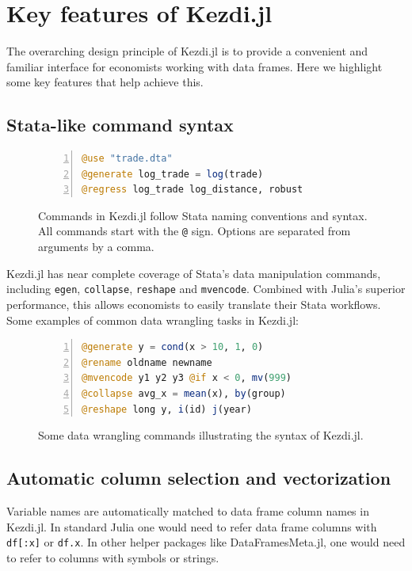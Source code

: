 \documentclass{juliacon}
\begin{document}
\section{Key features of Kezdi.jl}

The overarching design principle of Kezdi.jl is to provide a convenient and familiar interface for economists working with data frames. Here we highlight some key features that help achieve this.

\subsection{Stata-like command syntax}

\begin{figure}[t]
\begin{lstlisting}[language = Julia, numbers=left, numberstyle=\tiny\color{gray}]
@use "trade.dta"
@generate log_trade = log(trade)
@regress log_trade log_distance, robust
\end{lstlisting}
\caption{Commands in Kezdi.jl follow Stata naming conventions and syntax. All commands start with the \texttt{@} sign. Options are separated from arguments by a comma.}
\label{fig:syntax}
\end{figure}

Kezdi.jl has near complete coverage of Stata's data manipulation commands, including \texttt{egen}, \texttt{collapse}, \texttt{reshape} and \texttt{mvencode}. Combined with Julia's superior performance, this allows economists to easily translate their Stata workflows. Some examples of common data wrangling tasks in Kezdi.jl:

\begin{figure}[t]
\begin{lstlisting}[language = Julia, numbers=left, numberstyle=\tiny\color{gray}]
@generate y = cond(x > 10, 1, 0)
@rename oldname newname
@mvencode y1 y2 y3 @if x < 0, mv(999)
@collapse avg_x = mean(x), by(group)
@reshape long y, i(id) j(year)
\end{lstlisting}
\caption{Some data wrangling commands illustrating the syntax of Kezdi.jl.}
\label{fig:wrangling}
\end{figure}

\subsection{Automatic column selection and vectorization}

Variable names are automatically matched to data frame column names in Kezdi.jl. In standard Julia one would need to refer data frame columns with \texttt{df[:x]} or \texttt{df.x}. In other helper packages like DataFramesMeta.jl, one would need to refer to columns with symbols or strings.
\end{document}

